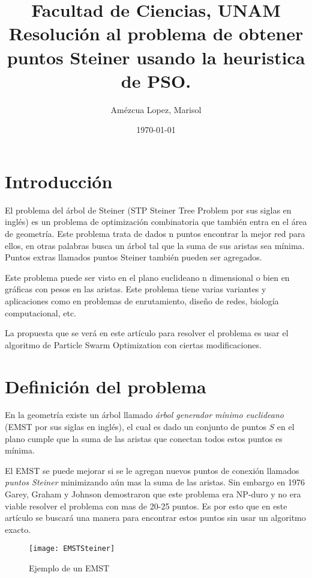 \documentclass[11pt,letterpaper]{article}
\title {Facultad de Ciencias, UNAM\\
		Resolución al problema de obtener puntos Steiner usando la heuristica de PSO.\\  
		}
\author{Amézcua Lopez, Marisol}
\date{\today}
\begin{document}
\maketitle

\section{Introducción}

El problema del árbol de Steiner (STP Steiner Tree Problem por sus siglas en inglés) es un problema de optimización combinatoria que también entra en el área de geometría. Este problema trata de dados n puntos encontrar la mejor red para ellos, en otras palabras busca un árbol tal que la suma de sus aristas sea mínima. Puntos extras llamados puntos Steiner también pueden ser agregados.

Este problema puede ser visto en el plano euclideano n dimensional o bien en gráficas con pesos en las aristas. Este problema tiene varias variantes y aplicaciones como en problemas de enrutamiento, diseño de redes, biología computacional, etc\cite{Decroos}.

La propuesta que se verá en este artículo para resolver el problema es usar el algoritmo de Particle Swarm Optimization con ciertas modificaciones.

\section{Definición del problema}

En la geometría existe un árbol llamado \textit{árbol generador mínimo euclideano} (EMST por sus siglas en inglés), el cual es dado un conjunto de puntos $S$ en el plano cumple que la suma de las aristas que conectan todos estos puntos es mínima.

El EMST se puede mejorar si se le agregan nuevos puntos de conexión llamados \textit{puntos Steiner} minimizando aún mas la suma de las aristas. Sin embargo en 1976 Garey, Graham y Johnson demostraron que este problema era NP-duro y no era viable resolver el problema con mas de 20-25 puntos\cite{Preparata}. Es por esto que en este artículo se buscará una manera para encontrar estos puntos sin usar un algoritmo exacto.

\begin{figure}
	\centering
	\texttt{[image: EMSTSteiner]}
	\caption{Ejemplo de un EMST}
	\label{fig:emststeiner}
\end{figure}
\end{document}
